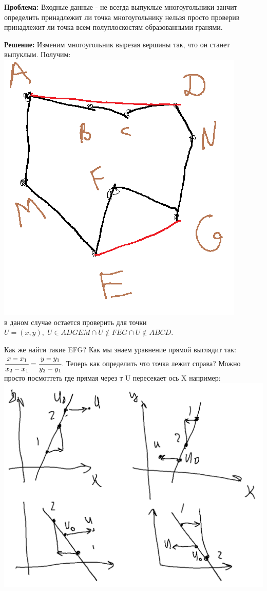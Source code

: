 \documentclass[12pt]{article} %
\begin{document}
 	 \textbf{Проблема: }Входные данные - не всегда выпуклые многоугольники занчит определить принадлежит ли точка многоугольнику нельзя просто проверив принадлежит ли точка всем полуплоскостям образованными гранями. \par
 	 \textbf{Решение: }Изменим многоугольник вырезая вершины так, что он станет выпуклым. Получим: \\
 	 \includegraphics[scale=0.7]{1}\\
 	 в даном случае остается проверить для точки $U = (x, y), \; U \in ADGEM \cap U \notin FEG \cap U \notin ABCD$. \par
 	 Как же найти такие EFG? Как мы знаем уравнение прямой выглядит так: $\cfrac{x-x_1}{x_2 - x_1} = \cfrac{y-y_1}{y_2 -y_1}$. Теперь как определить что точка лежит справа? Можно просто посмоттеть где прямая через т U пересекает ось X например:\\
 	 \includegraphics[scale=0.9]{2}\\
\end{document}
